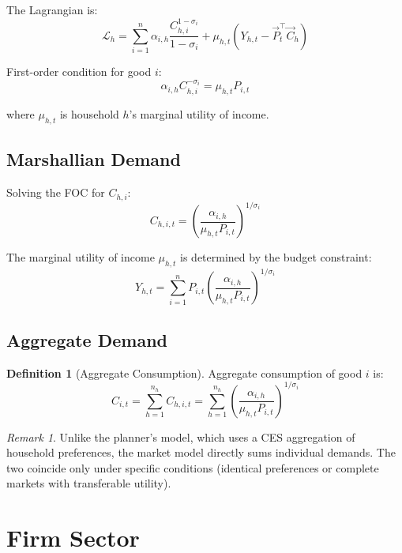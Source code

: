 \documentclass[12pt,a4paper]{article}
\theoremstyle{definition}
\newtheorem{definition}[theorem]{Definition}
\theoremstyle{remark}
\newtheorem{remark}[theorem]{Remark}
\begin{document}
The Lagrangian is:
$$\mathcal{L}_h = \sum_{i=1}^{n} \alpha_{i,h} \frac{C_{h,i}^{1-\sigma_i}}{1-\sigma_i} + \mu_{h,t}\left(Y_{h,t} - \vec{P}_t^\top \vec{C}_h\right)$$

First-order condition for good $i$:
\begin{equation}
    \alpha_{i,h} C_{h,i}^{-\sigma_i} = \mu_{h,t} P_{i,t}
\end{equation}

where $\mu_{h,t}$ is household $h$'s marginal utility of income.

\subsection{Marshallian Demand}

Solving the FOC for $C_{h,i}$:
\begin{equation}
    C_{h,i,t} = \left(\frac{\alpha_{i,h}}{\mu_{h,t} P_{i,t}}\right)^{1/\sigma_i}
\end{equation}

The marginal utility of income $\mu_{h,t}$ is determined by the budget constraint:
\begin{equation}
    Y_{h,t} = \sum_{i=1}^n P_{i,t} \left(\frac{\alpha_{i,h}}{\mu_{h,t} P_{i,t}}\right)^{1/\sigma_i}
\end{equation}

\subsection{Aggregate Demand}

\begin{definition}[Aggregate Consumption]
Aggregate consumption of good $i$ is:
\begin{equation}
    C_{i,t} = \sum_{h=1}^{n_h} C_{h,i,t} = \sum_{h=1}^{n_h} \left(\frac{\alpha_{i,h}}{\mu_{h,t} P_{i,t}}\right)^{1/\sigma_i}
\end{equation}
\end{definition}

\begin{remark}
Unlike the planner's model, which uses a CES aggregation of household preferences, the market model directly sums individual demands. The two coincide only under specific conditions (identical preferences or complete markets with transferable utility).
\end{remark}

\section{Firm Sector}
\end{document}
